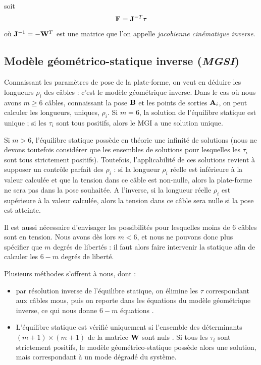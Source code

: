 soit  
\begin{equation}
\mathcal {\bf F} = {\bf J}^{-T} {\bf \tau}
\label{intro:eq5b}
\end{equation}
où ${\bf J}^{-1} = - {\bf W}^T$ est une matrice que l'on appelle {\it 
jacobienne cin\'ematique inverse}.

\subsection{Modèle géométrico-statique inverse ({\it MGSI})} 
\label{chap0-2-3}

Connaissant les paramètres de pose de la plate-forme, on veut en déduire les 
longueurs $\rho_i$ des câbles : c'est le modèle géométrique inverse. 
Dans le cas où nous avons $m \geq 6$ câbles, connaissant la pose ${\bf B}$ et 
les points de sorties ${\bf A}_i$, on peut calculer les longueurs, uniques, 
$\rho_i$. Si $m = 6$, la solution de l'équilibre statique est unique ; si les 
$\tau_i$ sont tous positifs, alors le MGI a une solution unique.

Si $m > 6$, l'\'equilibre statique possède en théorie une infinité de solutions 
(nous ne devons toutefois consid\'erer que les ensembles de solutions pour 
lesquelles les $\tau_i$ sont tous strictement positifs). Toutefois, 
l'applicabilit\'e de ces solutions revient \`a supposer un contr\^ole parfait 
des $\rho_i$ : si la longueur $\rho_i$ r\'eelle est inf\'erieure \`a la valeur 
calcul\'ee et que la tension dans ce c\^able est non-nulle, alors la 
plate-forme ne sera pas dans la pose souhait\'ee. A l'inverse, si la 
longueur r\'eelle $\rho_i$ est sup\'erieure \`a la valeur calcul\'ee, alors la 
tension dans ce c\^able sera nulle si la pose est atteinte.

Il est aussi n\'ecessaire d'envisager les possibilit\'es pour lesquelles moins 
de $6$ c\^ables sont en tension. Nous avons d\`es lors $m < 6$, et nous ne 
pouvons donc plus sp\'ecifier que $m$ degr\'es de libert\'es : il faut alors 
faire intervenir la statique afin de calculer les $6-m$ degr\'es de libert\'e. 

Plusieurs m\'ethodes s'offrent \`a nous, dont :
\begin{itemize}
 \item par r\'esolution inverse de l'\'equilibre statique, on \'elimine les 
$\tau$ correspondant aux c\^ables mous, puis on reporte dans les \'equations du 
mod\`ele g\'eom\'etrique inverse, ce qui nous donne $6-m$ \'equations 
\cite{2010:Carricato.Merlet}.
\item L'équilibre statique est vérifié uniquement si l'ensemble des déterminants 
$(m+1) \times (m+1)$ de la matrice ${\bf W}$ sont nuls 
\cite{carricato_merlet2013}. Si tous les $\tau_i$ sont strictement positifs, le 
modèle géométrico-statique possède alors une solution, mais correspondant à un 
mode dégradé du système.
\end{itemize}


